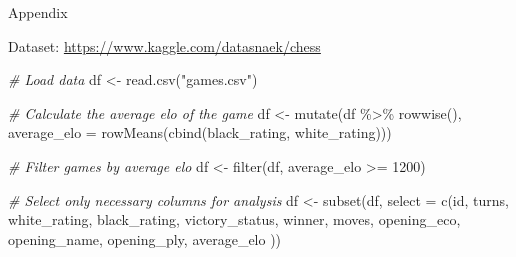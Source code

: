 \documentclass[11pt,]{article}
\newenvironment{Shaded}{\begin{snugshade}}{\end{snugshade}}
\newcommand{\AttributeTok}[1]{\textcolor[rgb]{0.77,0.63,0.00}{#1}}
\newcommand{\CommentTok}[1]{\textcolor[rgb]{0.56,0.35,0.01}{\textit{#1}}}
\newcommand{\DecValTok}[1]{\textcolor[rgb]{0.00,0.00,0.81}{#1}}
\newcommand{\FunctionTok}[1]{\textcolor[rgb]{0.00,0.00,0.00}{#1}}
\newcommand{\NormalTok}[1]{#1}
\newcommand{\OtherTok}[1]{\textcolor[rgb]{0.56,0.35,0.01}{#1}}
\newcommand{\SpecialCharTok}[1]{\textcolor[rgb]{0.00,0.00,0.00}{#1}}
\newcommand{\StringTok}[1]{\textcolor[rgb]{0.31,0.60,0.02}{#1}}
\begin{document}
\begin{center}
\Large{Appendix}
\end{center}

\noindent Dataset: \url{https://www.kaggle.com/datasnaek/chess}

\begin{Shaded}
\begin{Highlighting}[]
\CommentTok{\# Load data}
\NormalTok{df }\OtherTok{\textless{}{-}} \FunctionTok{read.csv}\NormalTok{(}\StringTok{"games.csv"}\NormalTok{)}

\CommentTok{\# Calculate the average elo of the game}
\NormalTok{df }\OtherTok{\textless{}{-}} \FunctionTok{mutate}\NormalTok{(df }\SpecialCharTok{\%\textgreater{}\%} \FunctionTok{rowwise}\NormalTok{(),}
       \AttributeTok{average\_elo =} \FunctionTok{rowMeans}\NormalTok{(}\FunctionTok{cbind}\NormalTok{(black\_rating, white\_rating)))}

\CommentTok{\# Filter games by average elo}
\NormalTok{df }\OtherTok{\textless{}{-}} \FunctionTok{filter}\NormalTok{(df, average\_elo }\SpecialCharTok{\textgreater{}=} \DecValTok{1200}\NormalTok{)}

\CommentTok{\# Select only necessary columns for analysis}
\NormalTok{df }\OtherTok{\textless{}{-}} \FunctionTok{subset}\NormalTok{(df, }
             \AttributeTok{select =} \FunctionTok{c}\NormalTok{(id, turns, white\_rating, black\_rating, victory\_status, }
\NormalTok{                        winner, moves, opening\_eco, opening\_name, opening\_ply, }
\NormalTok{                        average\_elo ))}
\end{Highlighting}
\end{Shaded}
\end{document}
